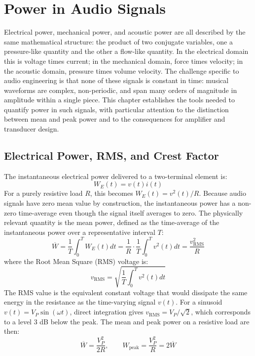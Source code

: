 
\graphicspath{{00_Images/05_chapter/}}

\chapter{Power in Audio Signals}
\label{ch:power}

Electrical power, mechanical power, and acoustic power are all described by the same mathematical structure: the product of two conjugate variables, one a pressure-like quantity and the other a flow-like quantity. In the electrical domain this is voltage times current; in the mechanical domain, force times velocity; in the acoustic domain, pressure times volume velocity. The challenge specific to audio engineering is that none of these signals is constant in time: musical waveforms are complex, non-periodic, and span many orders of magnitude in amplitude within a single piece. This chapter establishes the tools needed to quantify power in such signals, with particular attention to the distinction between mean and peak power and to the consequences for amplifier and transducer design.

\section{Electrical Power, RMS, and Crest Factor}
\label{sc:51}

The instantaneous electrical power delivered to a two-terminal element is:
\[
W_E(t) = v(t) i(t)
\]
For a purely resistive load \(R\), this becomes \(W_E(t) = v^2(t)/R\). Because audio signals have zero mean value by construction, the instantaneous power has a non-zero time-average even though the signal itself averages to zero. The physically relevant quantity is the mean power, defined as the time-average of the instantaneous power over a representative interval \(T\):
\[
\overline{W} = \frac{1}{T}\int_0^T W_E(t) dt = \frac{1}{R}\cdot\frac{1}{T}\int_0^T v^2(t) dt = \frac{v_\mathrm{RMS}^2}{R}
\]
where the Root Mean Square (RMS) voltage is:
\[
v_\mathrm{RMS} = \sqrt{\frac{1}{T}\int_0^T v^2(t) dt}
\]
The RMS value is the equivalent constant voltage that would dissipate the same energy in the resistance as the time-varying signal \(v(t)\). For a sinusoid \(v(t) = V_P\sin(\omega t)\), direct integration gives \(v_\mathrm{RMS} = V_P/\sqrt{2}\), which corresponds to a level 3 dB below the peak. The mean and peak power on a resistive load are then:
\[
\overline{W} = \frac{V_P^2}{2R}, \qquad W_\mathrm{peak} = \frac{V_P^2}{R} = 2 \overline{W}
\]


